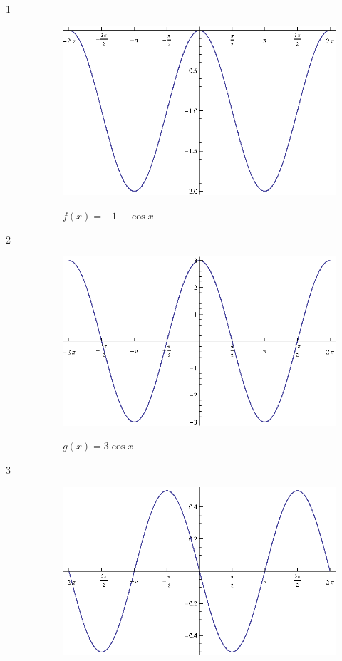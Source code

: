\documentclass{exam}
\begin{document}
  \begin{description}
    \item[1]
      \begin{figure}[H]
        \centering
        \includegraphics[scale=0.8]{example01.eps}

        $f(x) = -1 + \cos x$
      \end{figure}

    \item[2]
      \begin{figure}[H]
        \centering
        \includegraphics[scale=0.8]{example02.eps}

        $g(x) = 3 \cos x$
      \end{figure}

    \item[3]
      \begin{figure}[H]
        \centering
        \includegraphics[scale=0.9]{example03.eps}


\end{figure}
\end{description}
\end{document}

